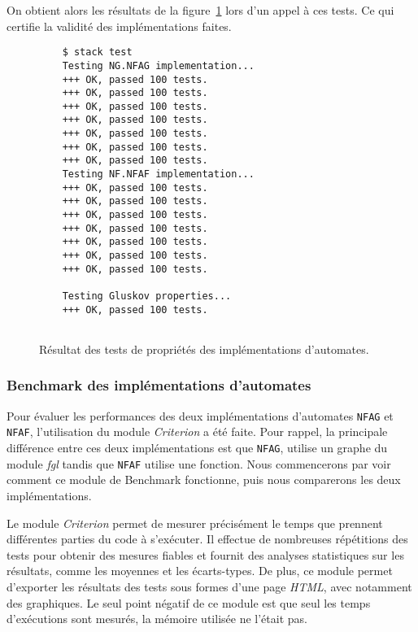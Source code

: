 \vphantom{}

On obtient alors les résultats de la figure~\ref{fig:resTest} lors d'un appel
à ces tests. Ce qui certifie la validité des implémentations faites.

\begin{figure}[H]
    \begin{verbatim}
    $ stack test
    Testing NG.NFAG implementation...
    +++ OK, passed 100 tests.
    +++ OK, passed 100 tests.
    +++ OK, passed 100 tests.
    +++ OK, passed 100 tests.
    +++ OK, passed 100 tests.
    +++ OK, passed 100 tests.
    +++ OK, passed 100 tests.
    Testing NF.NFAF implementation...
    +++ OK, passed 100 tests.
    +++ OK, passed 100 tests.
    +++ OK, passed 100 tests.
    +++ OK, passed 100 tests.
    +++ OK, passed 100 tests.
    +++ OK, passed 100 tests.
    +++ OK, passed 100 tests.
    
    Testing Gluskov properties...
    +++ OK, passed 100 tests.
    
  \end{verbatim}
    \caption{Résultat des tests de propriétés des implémentations d'automates.}
    \label{fig:resTest}
\end{figure}

\subsubsection{Benchmark des implémentations d'automates}\label{section:bench}

Pour évaluer les performances des deux implémentations d'automates
\texttt{NFAG} et \texttt{NFAF}, l'utilisation du
module \textit{Criterion}\cite{criterion} a été faite. Pour rappel, la principale différence
entre ces deux implémentations est que \texttt{NFAG}, utilise un
graphe du module \textit{fgl} tandis que \texttt{NFAF} utilise une
fonction. Nous commencerons par voir comment ce module de Benchmark fonctionne,
puis nous comparerons les deux implémentations.

\vphantom{}

Le module \textit{Criterion} permet de mesurer précisément le temps que
prennent différentes parties du code à s'exécuter. Il effectue de
nombreuses répétitions des tests pour obtenir des mesures fiables et fournit des
analyses statistiques sur les résultats, comme les moyennes et les écarts-types.
De plus, ce module permet d'exporter les résultats des tests sous formes d'une
page \textit{HTML}, avec notamment des graphiques. Le seul point négatif de ce
module est que seul les temps d'exécutions sont mesurés, la mémoire utilisée ne
l'était pas.

